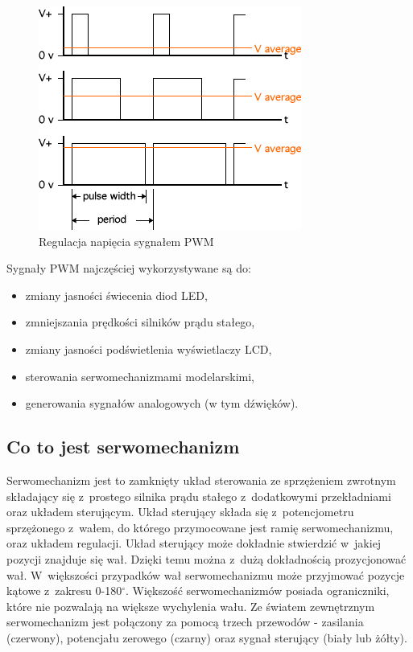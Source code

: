 \documentclass[eng,oneside]{mgr}
\begin{document}
			\begin{figure}[!htb]
				\begin{center}
					\includegraphics[scale=0.8]{pwm}
				\end{center}
				\caption{Regulacja napięcia sygnałem PWM}
				\label{fig:pwm}
			\end{figure}
			
			Sygnały PWM najczęściej wykorzystywane są do:
			\begin{itemize}
			 	\item zmiany jasności świecenia diod LED,
			 	\item zmniejszania prędkości silników prądu stałego,
			 	\item zmiany jasności podświetlenia wyświetlaczy LCD,
			 	\item sterowania serwomechanizmami modelarskimi,
			 	\item generowania sygnałów analogowych (w tym dźwięków).
			 \end{itemize} 

			\subsection{Co to jest serwomechanizm}
			Serwomechanizm jest to zamknięty układ sterowania ze sprzężeniem zwrotnym składający się z~prostego silnika prądu stałego z~dodatkowymi przekładniami oraz układem sterującym. Układ sterujący składa się z~potencjometru sprzężonego z~wałem, do którego przymocowane jest ramię serwomechanizmu, oraz układem regulacji. Układ sterujący może dokładnie stwierdzić w~jakiej pozycji znajduje się wał. Dzięki temu można z~dużą dokładnością prozycjonować wał. W~większości przypadków wał serwomechanizmu może przyjmować pozycje kątowe z~zakresu 0-180$^{\circ}$. Większość serwomechanizmów posiada ograniczniki, które nie pozwalają na większe wychylenia wału. Ze światem zewnętrznym serwomechanizm jest połączony za pomocą trzech przewodów - zasilania (czerwony), potencjału zerowego (czarny) oraz sygnał sterujący (biały lub żółty).
\end{document}
